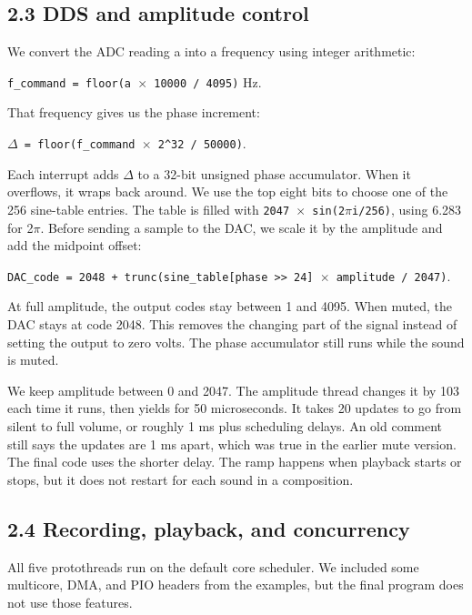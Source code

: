 \documentclass[11pt,letterpaper]{article}
\begin{document}
\subsection*{2.3 DDS and amplitude control}

We convert the ADC reading a into a frequency using integer arithmetic:

\texttt{f\_command = floor(a \ensuremath{\times} 10000 / 4095)} Hz.

That frequency gives us the phase increment:

\texttt{\ensuremath{\Delta} = floor(f\_command \ensuremath{\times} 2\textasciicircum{}32 / 50000)}.

Each interrupt adds \ensuremath{\Delta} to a 32-bit unsigned phase accumulator. When it overflows, it wraps back around. We use the top eight bits to choose one of the 256 sine-table entries. The table is filled with \texttt{2047 \ensuremath{\times} sin(2\ensuremath{\pi}i/256)}, using 6.283 for 2\ensuremath{\pi}. Before sending a sample to the DAC, we scale it by the amplitude and add the midpoint offset:

\texttt{DAC\_code = 2048 + trunc(sine\_table[phase >> 24] \ensuremath{\times} amplitude / 2047)}.

At full amplitude, the output codes stay between 1 and 4095. When muted, the DAC stays at code 2048. This removes the changing part of the signal instead of setting the output to zero volts. The phase accumulator still runs while the sound is muted.

We keep amplitude between 0 and 2047. The amplitude thread changes it by 103 each time it runs, then yields for 50 microseconds. It takes 20 updates to go from silent to full volume, or roughly 1 ms plus scheduling delays. An old comment still says the updates are 1 ms apart, which was true in the earlier mute version. The final code uses the shorter delay. The ramp happens when playback starts or stops, but it does not restart for each sound in a composition.

\subsection*{2.4 Recording, playback, and concurrency}

All five protothreads run on the default core scheduler. We included some multicore, DMA, and PIO headers from the examples, but the final program does not use those features.
\end{document}
